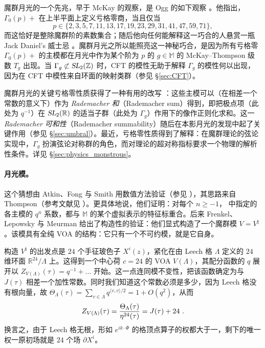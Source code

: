 \documentclass[11pt,a4paper,fontset=windows]{ctexart}
\numberwithin{equation}{section}
\newcommand{\SL}{\operatorname{\textsl{SL}}}      %
\newcommand{\myparagraph}[1]{\paragraph{#1}\mbox\\}
\newcommand{\RR}{\mathbb{R}}
\newcommand{\ZZ}{\mathbb{Z}}
\newcommand{\MM}{\mathbb{M}}
\def\t{\tau}
\newcommand{\be}{\begin{equation}}
\newcommand{\ee}{\end{equation}}
\begin{document}
魔群月光的一个先兆，早于 McKay 的观察，是 Ogg 的如下观察 \cite{ogg1974automorphismes}。他指出，$\Gamma_0(p)+$ 在上半平面上定义亏格零商，当且仅当
\be
p\in \{ 2, 3, 5, 7, 11, 13, 17, 19, 23, 29, 31, 41, 47, 59, 71\}, 
\ee
而这恰好是整除魔群阶的素数集合；随后他向任何能解释这一巧合的人悬赏一瓶 Jack Daniel's 威士忌 \cite{ogg1974automorphismes}。魔群月光之所以能照亮这一神秘巧合，是因为所有亏格零 $\Gamma_0(p)+$ 的主模都在月光中作为某个阶为 $p$ 的 $g\in \MM$ 的 McKay–Thompson 级数 $T_g$ 出现。当 $\Gamma_g\not\subset \SL_2(\ZZ)$ 时，CFT 的模性无助于解释 $\Gamma_g$ 的模性何以出现，因为在 CFT 中模性来自环面的映射类群（参见 \S\ref{sec:CFT}）。


魔群月光的关键亏格零性质获得了一种有用的改写 \cite{DunFre_RSMG}：这些主模可以（在相差一个常数的意义下）作为 \emph{Rademacher 和}（Rademacher sum）得到，即把极点项（此处为 $q^{-1}$）在 $\SL_2(\RR)$ 的适当子群（此处为 $\Gamma_g$）作用下的像作正则化求和。这一 \emph{Rademacher 可和性}（Rademacher summability）随后在本影月光的发现中起了关键作用（参见 \S\ref{sec:umbral}）。最近，亏格零性质得到了解释：在魔群理论的弦论实现中，$\Gamma_g$ 扮演弦论对称群的角色，而对理论的超对称指标要求一个物理的解析性条件。详见 \S\ref{sec:physics_monstrous}。


\myparagraph{月光模。}
这个猜想由 Atkin、Fong 与 Smith 用数值方法验证（参见 \cite{fong1980characters,smith1985head}），其思路来自 Thompson（参考文献见 \cite{MR2201600}）。更具体地说，他们证明：对每个 $n\ge -1$，\cite{conway_norton} 中指定的各主模的 $q^n$ 系数，都与 $\MM$ 的某个虚拟表示的特征标重合。后来 Frenkel、Lepowsky 与 Meurman \cite{FLMPNAS,FLMBerk} 给出了构造性的验证：他们显式构造了一个魔群模 $V=V^\natural$。该模具有全纯 VOA 的结构：它只有一个不可约模，就是它自身。


构造 $V^\natural$ 的出发点是 $24$ 个手征玻色子 $X^i(z)$，紧化在由 Leech 格 $\Lambda$ 定义的 $24$ 维环面 $\RR^{24}/\Lambda$ 上。这得到一个中心荷 $c=24$ 的 VOA $V(\Lambda)$，其配分函数的 $q$ 展开以
\( Z_{V(\Lambda)}(\tau)=q^{-1}+\dots\) 开始。这一点连同模不变性，把该函数确定为与 $J(\tau)$ 相差一个加性常数。同时我们知道这个常数必须是多少，因为 Leech 格没有根向量，故 $\Theta_{\Lambda}(\t) =\sum_{v\in \Lambda} q^{\langle v,v\rangle/2}  = 1+ O(q^2)$，从而
\be
Z_{V(\Lambda)}(\tau)= {\Theta_{\Lambda}(\t)\over \eta^{24}(\t)} = J(\t)+24~. 
\ee
换言之，由于 Leech 格无根，形如 $e^{ik\cdot\Phi}$ 的格顶点算子的权都大于一，剩下的唯一权一原初场就是 $24$ 个场 $\partial X^i$。
\end{document}
